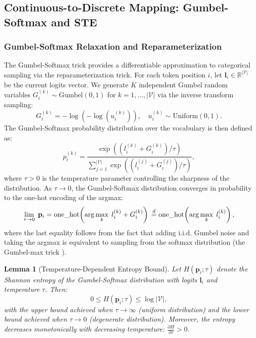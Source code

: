 ﻿\documentclass[lettersize,journal]{IEEEtran}
\newtheorem{lemma}{Lemma}
\begin{document}
\subsection{Continuous-to-Discrete Mapping: Gumbel-Softmax and STE}
\label{sec:gumbel_ste}

\subsubsection{Gumbel-Softmax Relaxation and Reparameterization}
\label{sec:gumbel}

The Gumbel-Softmax trick \cite{jang2017categorical, maddison2017concrete} provides a differentiable approximation to categorical sampling via the reparameterization trick. For each token position $i$, let $\mathbf{l}_i \in \mathbb{R}^{|\mathcal{V}|}$ be the current logits vector. We generate $K$ independent Gumbel random variables $G_i^{(k)} \sim \text{Gumbel}(0, 1)$ for $k = 1, \ldots, |\mathcal{V}|$ via the inverse transform sampling:
\begin{equation}
\label{eq:gumbel_sample}
G_i^{(k)} = -\log(-\log(u_i^{(k)})), \quad u_i^{(k)} \sim \text{Uniform}(0, 1).
\end{equation}
The Gumbel-Softmax probability distribution over the vocabulary is then defined as:
\begin{equation}
\label{eq:gumbel_softmax}
p_i^{(k)} = \frac{\exp\left((l_i^{(k)} + G_i^{(k)}) / \tau\right)}{\sum_{j=1}^{|\mathcal{V}|} \exp\left((l_i^{(j)} + G_i^{(j)}) / \tau\right)},
\end{equation}
where $\tau > 0$ is the temperature parameter controlling the sharpness of the distribution. As $\tau \to 0$, the Gumbel-Softmax distribution converges in probability to the one-hot encoding of the argmax:
\begin{equation}
\label{eq:gumbel_limit}
\lim_{\tau \to 0} \; \mathbf{p}_i = \text{one\_hot}\!\left(\arg\max_{k} \; l_i^{(k)} + G_i^{(k)}\right) \\\\
\overset{d}{=} \text{one\_hot}\!\left(\arg\max_{k} \; l_i^{(k)}\right),
\end{equation}
where the last equality follows from the fact that adding i.i.d. Gumbel noise and taking the argmax is equivalent to sampling from the softmax distribution (the Gumbel-max trick \cite{gumbel1954statistical}).

\begin{lemma}[Temperature-Dependent Entropy Bound]
\label{lem:entropy}
Let $H(\mathbf{p}_i; \tau)$ denote the Shannon entropy of the Gumbel-Softmax distribution with logits $\mathbf{l}_i$ and temperature $\tau$. Then:
\begin{equation}
\label{eq:entropy_bound}
0 \leq H(\mathbf{p}_i; \tau) \leq \log |\mathcal{V}|,
\end{equation}
with the upper bound achieved when $\tau \to \infty$ (uniform distribution) and the lower bound achieved when $\tau \to 0$ (degenerate distribution). Moreover, the entropy decreases monotonically with decreasing temperature: $\frac{\partial H}{\partial \tau} > 0$.
\end{lemma}
\end{document}
